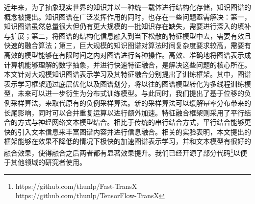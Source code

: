 \begin{cabstract}

  近年来，为了抽象现实世界的知识并以一种统一载体进行结构化存储，知识图谱的概念被提出。知识图谱在广泛发挥作用的同时，也存在一些问题亟需解决：第一，知识图谱虽然总量很大但仍有更大规模的一批知识存在缺失，需要进行深入的填补与扩展；第二，将图谱的结构化信息融入到当下松散的特征模型中去，需要有效且快速的融合算法；第三，巨大规模的知识图谱对算法时间复杂度要求较高，需要有高效的模型能够在有限时间之内对图谱进行各种操作。高效、准确地将图谱表示成计算机能够理解的数字抽象，并进行快速特征融合，是解决这些问题的核心所在。本文针对大规模知识图谱表示学习及其特征融合分别提出了训练框架。其中，图谱表示学习框架通过底层优化以及图谱划分，将以往的图谱模型转化为多线程训练模型，未来可以进一步衍生为分布式训练模型。与此同时，我们提出了基于位移的负例采样算法，来取代原有的负例采样算法。新的采样算法可以缓解幂率分布带来的长尾影响，同时可以合并重复运算以进行额外加速。特征融合框架则采用了平行结合的方式与神经网络文本模型结合。相比于传统的串行结合方式，平行结合能够更快的引入文本信息来丰富图谱内容并进行信息融合。相关的实验表明，本文提出的框架能够在效果不降低的情况下极快的加速图谱表示学习，并和文本模型有很好的融合效果，使得融合之后两者都有显著效果提升。我们已经开源了部分代码\footnote{https://github.com/thunlp/Fast-TransX \\ https://github.com/thunlp/TensorFlow-TransX}以便于其他领域的研究者使用。

\end{cabstract}


